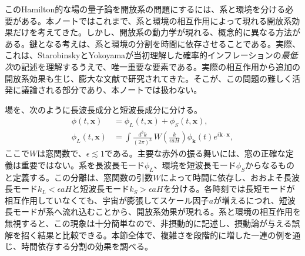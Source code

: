 \documentclass[a4paper,11pt,oneside]{article}
\theoremstyle{definition}
\numberwithin{equation}{section}
\newcommand{\bfx}{\mathbf{x}}
\begin{document}
このHamilton的な場の量子論を開放系の問題にするには、系と環境を分ける必要がある。本ノートではこれまで、系と環境の相互作用によって現れる開放系効果だけを考えてきた。しかし、開放系の動力学が現れる、概念的に異なる方法がある。鍵となる考えは、系と環境の分割を時間に依存させることである。実際、これは、StarobinskyとYokoyama\cite{Starobinsky:1986fx,Starobinsky:1994bd}が当初理解した確率的インフレーションの\textit{最低次}の記述を理解するうえで、唯一重要な要素である。実際の相互作用から追加の開放系効果も生じ、膨大な文献で研究されてきた。そこが、この問題の難しく活発に議論される部分であり、本ノートでは扱わない。



場を、次のように長波長成分と短波長成分に分ける。
\begin{align}
\phi(t,\bfx)
&=
\phi_{L}(t,\bfx)
+
\phi_{S}(t,\bfx), \\
\phi_{L}(t,\mathbf{x})
&=
\int\frac{d^{3}k}{(2\pi)^{3}}\,
W\left(\frac{k}{\epsilon aH}\right)
\phi_{\mathbf{k}}(t)
e^{i\mathbf{k}\cdot\mathbf{x}},
\end{align}
ここで\(W\)は窓関数で、\(\epsilon\lesssim 1\)である。主要な赤外の振る舞いには、窓の正確な定義は重要ではない。系を長波長モード$ \phi_{L}$、環境を短波長モード$ \phi_{S}$からなるものと定義する。この分離は、窓関数の引数$ W$によって時間に依存し、おおよそ長波長モード$ k_{L}<\epsilon aH$と短波長モード$ k_{S}>\epsilon aH$を分ける。各時刻では長短モードが相互作用していなくても、宇宙が膨張してスケール因子$ a$が増えるにつれ、短波長モードが系へ流れ込むことから、開放系効果が現れる。系と環境の相互作用を無視すると、この現象は十分簡単なので、非摂動的に記述し、摂動論が与える誤解を招く結果と比較できる。本節全体で、複雑さを段階的に増した一連の例を通じ、時間依存する分割の効果を調べる。
\end{document}

